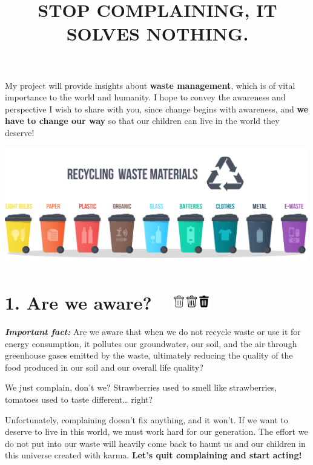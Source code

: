 \documentclass[
  11pt,
  a4paper,
  DIV=11,
  numbers=noendperiod]{scrartcl}
\title{STOP COMPLAINING, IT SOLVES NOTHING.}
\author{}
\date{}
\begin{document}
\maketitle

My project will provide insights about \textbf{waste management}, which
is of vital importance to the world and humanity. I hope to convey the
awareness and perspective I wish to share with you, since change begins
with awareness, and \textbf{we have to change our way} so that our
children can live in the world they deserve! \begin{center}
\includegraphics[width=5.20833in,height=\textheight]{assets/images/waste.png}
\end{center}

\section[{1. Are we aware?} ]{\texorpdfstring{{1. Are we aware?}
\protect\includegraphics[width=1.13542in,height=0.28125in]{assets/images/trash.jpg}}{1. Are we aware? }}\label{are-we-aware}

\textbf{\emph{Important fact:}} Are we aware that when we do not recycle
waste or use it for energy consumption, it pollutes our groundwater, our
soil, and the air through greenhouse gases emitted by the waste,
ultimately reducing the quality of the food produced in our soil and our
overall life quality?

We just complain, don't we? Strawberries used to smell like
strawberries, tomatoes used to taste different\ldots{} right?

Unfortunately, complaining doesn't fix anything, and it won't. If we
want to deserve to live in this world, we must work hard for our
generation. The effort we do not put into our waste will heavily come
back to haunt us and our children in this universe created with karma.
\textbf{Let's quit complaining and start acting!}
\end{document}
